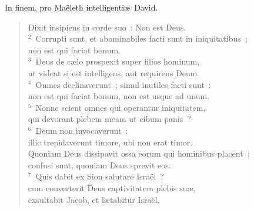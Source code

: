 \lettrine[lines=3,image=true,loversize=0.05,lraise=-0.03]{I}{}n finem, pro Ma\"eleth intelligenti\ae\ David. \begin{flushleft}\begin{verse}\vspace{6pt}Dixit insipiens in corde suo~: Non est Deus.\\
${}^{2}$~Corrupti sunt, et abominabiles facti sunt in iniquitatibus~;\\ non est qui faciat bonum.\\
${}^{3}$~Deus de c\ae lo prospexit super filios hominum,\\ ut videat si est intelligens, aut requirens Deum.\\
${}^{4}$~Omnes declinaverunt~; simul inutiles facti sunt~:\\ non est qui faciat bonum, non est usque ad unum.\\
${}^{5}$~Nonne scient omnes qui operantur iniquitatem,\\ qui devorant plebem meam ut cibum panis~?\\
${}^{6}$~Deum non invocaverunt~;\\ illic trepidaverunt timore, ubi non erat timor.\\ Quoniam Deus dissipavit ossa eorum qui hominibus placent~:\\ confusi sunt, quoniam Deus sprevit eos.\\
${}^{7}$~Quis dabit ex Sion salutare Isra\"el~?\\ cum converterit Deus captivitatem plebis su\ae ,\\ exsultabit Jacob, et l\ae tabitur Isra\"el.\end{verse}\end{flushleft}



